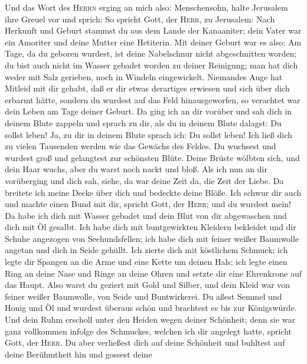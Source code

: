  Und das Wort des \textsc{Herrn} erging an mich also:
 Menschensohn, halte Jerusalem ihre Greuel vor und sprich:
 So spricht Gott, der \textsc{Herr}, zu Jerusalem: Nach
Herkunft und Geburt stammst du aus dem Lande der Kanaaniter; dein Vater
war ein Amoriter und deine Mutter eine Hetiterin.  Mit
deiner Geburt war es also: Am Tage, da du geboren wurdest, ist deine
Nabelschnur nicht abgeschnitten worden; du bist auch nicht im Wasser
gebadet worden zu deiner Reinigung; man hat dich weder mit Salz
gerieben, noch in Windeln eingewickelt.  Niemandes Auge
hat Mitleid mit dir gehabt, daß er dir etwas derartiges erwiesen und
sich über dich erbarmt hätte, sondern du wurdest auf das Feld
hinausgeworfen, so verachtet war dein Leben am Tage deiner Geburt.
 Da ging ich an dir vorüber und sah dich in deinem Blute
zappeln und sprach zu dir, als du in deinem Blute dalagst: Du sollst
leben! Ja, zu dir in deinem Blute sprach ich: Du sollst leben!
 Ich ließ dich zu vielen Tausenden werden wie das Gewächs
des Feldes. Du wuchsest und wurdest groß und gelangtest zur schönsten
Blüte. Deine Brüste wölbten sich, und dein Haar wuchs, aber du warst
noch nackt und bloß.  Als ich nun an dir vorüberging und
dich sah, siehe, da war deine Zeit da, die Zeit der Liebe. Da breitete
ich meine Decke über dich und bedeckte deine Blöße. Ich schwur dir auch
und machte einen Bund mit dir, spricht Gott, der \textsc{Herr}; und du
wurdest mein!  Da habe ich dich mit Wasser gebadet und
dein Blut von dir abgewaschen und dich mit Öl gesalbt. 
Ich habe dich mit buntgewirkten Kleidern bekleidet und dir Schuhe
angezogen von Seehundsfellen; ich habe dich mit feiner weißer Baumwolle
angetan und dich in Seide gehüllt.  Ich zierte dich mit
köstlichem Schmuck; ich legte dir Spangen an die Arme und eine Kette um
deinen Hals;  ich legte einen Ring an deine Nase und
Ringe an deine Ohren und setzte dir eine Ehrenkrone auf das Haupt.
 Also warst du geziert mit Gold und Silber, und dein
Kleid war von feiner weißer Baumwolle, von Seide und Buntwirkerei. Du
aßest Semmel und Honig und Öl und wurdest überaus schön und brachtest es
bis zur Königswürde.  Und dein Ruhm erscholl unter den
Heiden wegen deiner Schönheit; denn sie war ganz vollkommen infolge des
Schmuckes, welchen ich dir angelegt hatte, spricht Gott, der
\textsc{Herr}.  Du aber verließest dich auf deine
Schönheit und buhltest auf deine Berühmtheit hin und gossest deine
